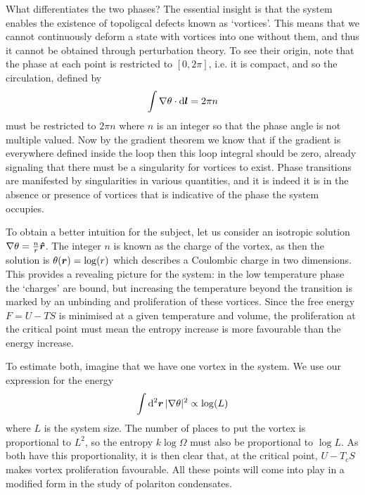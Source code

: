 What differentiates the two phases? The essential insight is that the system enables the existence of topoligcal defects known as `vortices'. This means that we cannot continuously deform a state with vortices into one without them, and thus it cannot be obtained through perturbation theory. To see their origin, note that the phase at each point is restricted to $[0, 2\pi]$,  i.e. it is compact, and so the circulation, defined by 
\[
\int \nabla \theta \cdot \dd{\boldsymbol{l}} = 2\pi n
\]
must be restricted to $2 \pi n$ where $n$ is an integer so that the phase angle is not multiple valued. Now by the gradient theorem we know that if the gradient is everywhere defined inside the loop then this loop integral should be zero, already signaling that there must be a singularity for vortices to exist. Phase transitions are manifested by singularities in various quantities, and it is indeed it is in the absence or presence of vortices that is indicative of the phase the system occupies. 

To obtain a better intuition for the subject, let us consider an isotropic solution $\nabla \theta = \frac{n}{r} \boldsymbol{\hat{r}}$. The integer $n$ is known as the charge of the vortex, as then the solution is $\theta(\boldsymbol{r}) = \log(r)$ which describes a Coulombic charge in two dimensions. This provides a revealing picture for the system: in the low temperature phase the `charges' are bound, but increasing the temperature beyond the transition is marked by an unbinding and proliferation of these vortices. Since the free energy $F = U - TS$ is minimised at a given temperature and volume, the proliferation at the critical point must mean the entropy increase is more favourable than the energy increase. 

To estimate both, imagine that we have one vortex in the system. We use our expression for the energy
\[
\int \dd[2]{\boldsymbol{r}} | \nabla \theta |^2 \propto \log(L)
\]
where $L$ is the system size. The number of places to put the vortex is proportional to $L^2$, so the entropy $k \log \Omega$ must also be proportional to $\log L$. As both have this proportionality, it is then clear that, at the critical point, $U - T_cS$ makes vortex proliferation favourable. All these points will come into play in a modified form in the study of polariton condensates.

